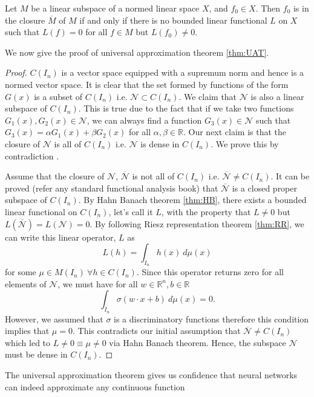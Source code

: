 \begin{thm}
    \label{thm:HB}
    Let $M$ be a linear subspace of a normed linear space $X$, and $f_0 \in X$. Then $f_0$ is 
    in the closure $\overline{M}$ of $M$ if and only if there is no bounded linear functional 
    $L$ on $X$ such that $L(f) = 0 $ for all $f\in M$ but $L(f_0) \neq 0$.
\end{thm}
We now give the proof of universal approximation theorem \ref{thm:UAT}.
\begin{proof}
   $C(I_n)$ is a vector space equipped with a supremum norm and hence is a normed vector space. It is
   clear that the set formed by functions of the form $G(x)$ is a subset of $C(I_n)$ i.e. $\mathcal{N} \subset C(I_n)$.
   We claim that $\mathcal{N}$ is also a linear subspace of $C(I_n)$. This is true due to the fact that if 
   we take two functions $G_1(x), G_2(x) \in \mathcal{N}$, we can always find a function $G_3(x) \in \mathcal{N}$ such that 
   $G_3(x) = \alpha G_1(x) + \beta G_2(x)$ for all $\alpha, \beta \in \mathbb{R}$. Our next claim is that the closure of 
   $\mathcal{N}$ is all of $C(I_n)$ i.e. $\mathcal{N}$ is dense in $C(I_n)$. We prove this by contradiction \cite{rudin}. 

   Assume that the closure of $\mathcal{N}$, $\overline{\mathcal{N}}$ is not all of $C(I_n)$ i.e. 
   $\overline{\mathcal{N}} \neq C(I_n)$. It can be proved (refer any standard functional analysis book) that $\overline{\mathcal{N}}$
   is a closed proper subspace of $C(I_n)$.  By Hahn Banach theorem \ref{thm:HB}, there exists a bounded 
   linear functional on $C(I_n)$, let's call it $L$, with the property that $L \neq 0$ but $L(\overline{\mathcal{N}}) = L(\mathcal{N}) = 0$.
   By following Riesz representation theorem \ref{thm:RR}, we can write this linear operator, $L$ as 
   $$L(h) = \int_{I_n} h(x) \ d\mu(x)$$
   for some $\mu \in M(I_n) \ \forall h \in C(I_n)$. Since this operator returns zero for all elements of $\mathcal{N}$,
   we must have for all $w \in \mathbb{R}^n, b \in \mathbb{R}$ 
   $$\int_{I_n} \sigma (w \cdot x + b) \ d\mu(x) = 0.$$
   However, we assumed that $\sigma$ is a discriminatory functions therefore this condition implies that $\mu =0$. This contradicts our initial assumption that 
   $\overline{\mathcal{N}} \neq C(I_n)$ which led to $L \neq 0 \equiv \mu \neq 0$ via Hahn Banach theorem. Hence, the subspace $\mathcal{N}$ must be dense in $C(I_n)$. 
\end{proof}
The universal approximation theorem gives us confidence that neural networks can indeed approximate any continuous function 
